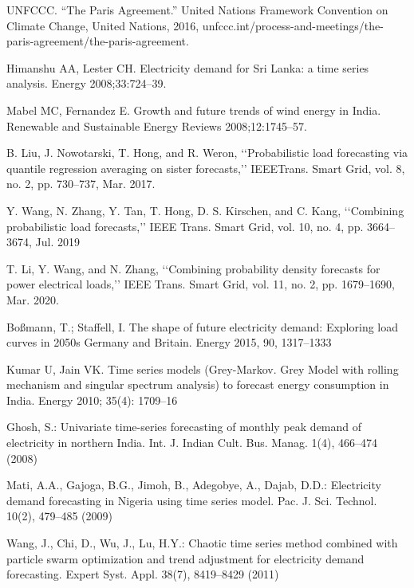 \documentclass[lettersize,journal]{IEEEtran}
\begin{document}
\begin{thebibliography}{1}
  
  UNFCCC. “The Paris Agreement.” United Nations Framework Convention on Climate Change, United Nations, 2016, unfccc.int/process-and-meetings/the-paris-agreement/the-paris-agreement.
  
  Himanshu AA, Lester CH. Electricity demand for Sri Lanka: a time series analysis. Energy 2008;33:724–39.

  Mabel MC, Fernandez E. Growth and future trends of wind energy in India. Renewable and Sustainable Energy Reviews 2008;12:1745–57.

  B. Liu, J. Nowotarski, T. Hong, and R. Weron, ‘‘Probabilistic load forecasting via quantile regression averaging on sister forecasts,’’ IEEETrans. Smart Grid, vol. 8, no. 2, pp. 730–737, Mar. 2017.

  Y. Wang, N. Zhang, Y. Tan, T. Hong, D. S. Kirschen, and C. Kang, ‘‘Combining probabilistic load forecasts,’’ IEEE Trans. Smart Grid, vol. 10, no. 4, pp. 3664–3674, Jul. 2019

  T. Li, Y. Wang, and N. Zhang, ‘‘Combining probability density forecasts for power electrical loads,’’ IEEE Trans. Smart Grid, vol. 11, no. 2, pp. 1679–1690, Mar. 2020.

  Boßmann, T.; Staffell, I. The shape of future electricity demand: Exploring load curves in 2050s Germany and Britain. Energy 2015, 90, 1317–1333


  Kumar U, Jain VK. Time series models (Grey-Markov. Grey Model with rolling mechanism and singular spectrum analysis) to forecast energy consumption in India. Energy 2010; 35(4): 1709–16

  Ghosh, S.: Univariate time-series forecasting of monthly peak demand of electricity in northern India. Int. J. Indian Cult. Bus. Manag. 1(4), 466–474 (2008)

  Mati, A.A., Gajoga, B.G., Jimoh, B., Adegobye, A., Dajab, D.D.: Electricity demand forecasting in Nigeria using time series model. Pac. J. Sci. Technol. 10(2), 479–485 (2009)

  Wang, J., Chi, D., Wu, J., Lu, H.Y.: Chaotic time series method combined with particle swarm optimization and trend adjustment for electricity demand forecasting. Expert Syst. Appl. 38(7), 8419–8429 (2011)


\end{thebibliography}
\end{document}
